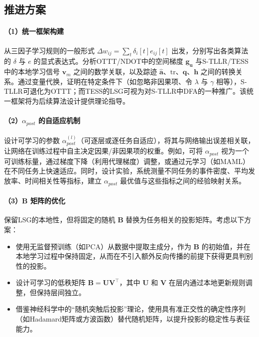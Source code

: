 \documentclass{article}
\begin{document}
\subsection{推进方案}

\paragraph{（1）统一框架构建}
从三因子学习规则的一般形式 \(\Delta w_{ij} = \sum_t \delta_i[t] e_{ij}[t]\) 出发，分别写出各类算法的 \(\delta\) 与 \(e\) 的显式表达式。分析OTTT/NDOT中的空间梯度 \(\mathbf{g}_{\mathbf{u}}\) 与S-TLLR/TESS中的本地学习信号 \(\mathbf{v}_m\) 之间的数学关联，以及踪迹 \(\hat{\mathbf{a}}\)、\(\text{tr}\)、\(\mathbf{q}\)、\(\mathbf{h}\) 之间的转换关系。通过变量代换，证明在特定条件下（如忽略非因果项、令 \(\lambda\) 与 \(\gamma\) 相等），S-TLLR可退化为OTTT；而TESS的LSG可视为对S-TLLR中DFA的一种推广。该统一框架将为后续算法设计提供理论指导。

\paragraph{（2）\(\alpha_{post}\) 的自适应机制}
设计可学习的参数 \(\alpha_{post}^{(l)}\)（可逐层或逐任务自适应），将其与网络输出误差相关联，让网络在训练过程中自主决定因果/非因果项的权重。例如，可将 \(\alpha_{post}\) 视为一个可训练标量，通过梯度下降（利用代理梯度）调整，或通过元学习（如MAML）在不同任务上快速适应。同时，设计实验，系统测量不同任务的事件密度、平均发放率、时间相关性等指标，建立 \(\alpha_{post}\) 最优值与这些指标之间的经验映射关系。

\paragraph{（3）\(\mathbf{B}\) 矩阵的优化}
保留LSG的本地性，但将固定的随机 \(\mathbf{B}\) 替换为任务相关的投影矩阵。考虑以下方案：
\begin{itemize}
    \item 使用无监督预训练（如PCA）从数据中提取主成分，作为 \(\mathbf{B}\) 的初始值，并在本地学习过程中保持固定，从而在不引入额外反向传播的前提下获得更具判别性的投影。
    \item 设计可学习的低秩矩阵 \(\mathbf{B} = \mathbf{U} \mathbf{V}^\top\)，其中 \(\mathbf{U}\) 和 \(\mathbf{V}\) 在层内通过本地更新规则调整，但保持层间独立。
    \item 借鉴神经科学中的“随机突触后投影”理论，使用具有准正交性的确定性序列（如Hadamard矩阵或方波函数）替代随机矩阵，以提升投影的稳定性与表征能力。
\end{itemize}
\end{document}
